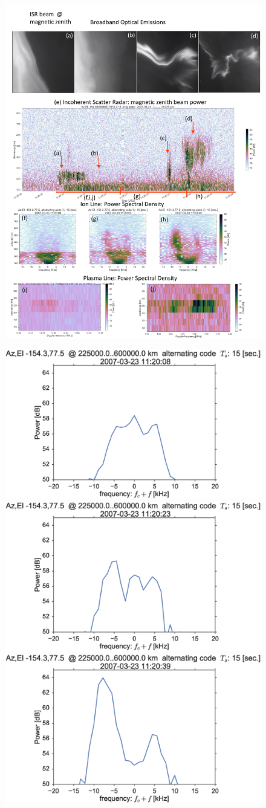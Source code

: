 \begin{figure}
    \noindent\includegraphics[width=0.9\columnwidth,trim=0 383 0 10,clip]{gfx/2007-03-23/2007-03-23}
    \vspace{0.1cm}
    
    \includegraphics[width=0.3\columnwidth,trim=0 55 0 0]{gfx/2007-03-23/acfslice_alternatingcode2007-03-2311-20-08}
    \includegraphics[width=0.3\columnwidth,trim=0 55 0 0]{gfx/2007-03-23/acfslice_alternatingcode2007-03-2311-20-23}
    \includegraphics[width=0.3\columnwidth,trim=0 55 0 0]{gfx/2007-03-23/acfslice_alternatingcode2007-03-2311-20-39}
    

\end{figure}
